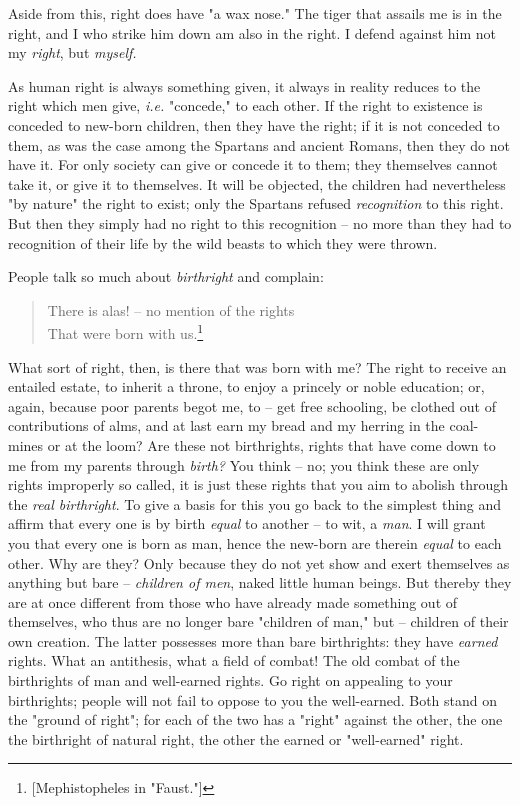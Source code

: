 \documentclass[a4paper]{book}
\begin{document}
Aside from this, right does have "{}a wax nose."{} The tiger that assails me 
is in the right, and I who strike him down am also in the right. I defend 
against him not my \textit{right}, but \textit{myself.}

As human right is always something given, it always in reality reduces to the 
right which men give, \textit{i.e.} "{}concede,"{} to each other. If the right 
to existence is conceded to new-born children, then they have the right; if it 
is not conceded to them, as was the case among the Spartans and ancient 
Romans, then they do not have it. For only society can give or concede it to 
them; they themselves cannot take it, or give it to themselves. It will be 
objected, the children had nevertheless "{}by nature"{} the right to exist; 
only the Spartans refused \textit{recognition} to this right. But then they 
simply had no right to this recognition -- no more than they had to 
recognition of their life by the wild beasts to which they were thrown.

People talk so much about \textit{birthright} and complain:

\begin{quotation}

\noindent{} There is alas! -- no mention of the rights\\
 That were born with us.\footnote{[Mephistopheles in "{}Faust."{}]} 
\end{quotation}

\noindent{}What sort of right, then, is there that was born with me? The right 
to receive an entailed estate, to inherit a throne, to enjoy a princely or 
noble education; or, again, because poor parents begot me, to -- get free 
schooling, be clothed out of contributions of alms, and at last earn my bread 
and my herring in the coal-mines or at the loom? Are these not birthrights, 
rights that have come down to me from my parents through \textit{birth?} You 
think -- no; you think these are only rights improperly so called, it is just 
these rights that you aim to abolish through the \textit{real birthright}. To 
give a basis for this you go back to the simplest thing and affirm that every 
one is by birth \textit{equal} to another -- to wit, a \textit{man}. I will 
grant you that every one is born as man, hence the new-born are therein 
\textit{equal} to each other. Why are they? Only because they do not yet show 
and exert themselves as anything but bare -- \textit{children of men}, naked 
little human beings. But thereby they are at once different from those who 
have already made something out of themselves, who thus are no longer bare 
"{}children of man,"{} but -- children of their own creation. The latter 
possesses more than bare birthrights: they have \textit{earned} rights. What 
an antithesis, what a field of combat! The old combat of the birthrights of 
man and well-earned rights. Go right on appealing to your birthrights; people 
will not fail to oppose to you the well-earned. Both stand on the "{}ground of 
right"{}; for each of the two has a "{}right"{} against the other, the one the 
birthright of natural right, the other the earned or "{}well-earned"{} right.
\end{document}
